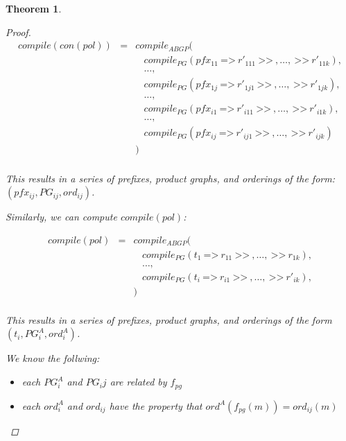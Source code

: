 \documentclass[twocolumn]{sig-alternate-10pt}
\newcommand{\Prefer}{\texttt{>>}}
\newcommand{\Path}{\texttt{=>}}
\newtheorem{thm}{Theorem}[section]
\begin{document}
\begin{thm}
\begin{proof}
    \[ \begin{array}{lcl}
        compile(con(pol)) &=& compile_{ABGP}( \\
                          & & ~~~~ compile_{PG}(pfx_{11} ~\Path~ r'_{111} ~\Prefer~,\dots, ~\Prefer~ r'_{11k} ), \\
                          & & ~~~~ \dots, \\
                          & & ~~~~ compile_{PG}(pfx_{1j} ~\Path~ r'_{1j1} ~\Prefer~,\dots, ~\Prefer~ r'_{1jk} ), \\
                          & & ~~~~ \dots, \\
                          & & ~~~~ compile_{PG}(pfx_{i1} ~\Path~ r'_{i11} ~\Prefer~,\dots, ~\Prefer~ r'_{i1k} ), \\
                          & & ~~~~ \dots, \\
                          & & ~~~~ compile_{PG}(pfx_{ij} ~\Path~ r'_{ij1} ~\Prefer~,\dots, ~\Prefer~ r'_{ijk} ) \\
                          & & ) \\
    \end{array} \]
 
    This results in a series of prefixes, product graphs, and orderings of the form: $(pfx_{ij}, PG_{ij}, ord_{ij})$.

    \vspace{1em}
    Similarly, we can compute $compile(pol)$:

    \[ \begin{array}{lcl}
        compile(pol) &=& compile_{ABGP}( \\
                     & & ~~~~ compile_{PG}(t_1 ~\Path~ r_{11} ~\Prefer~,\dots, ~\Prefer~ r_{1k} ), \\
                     & & ~~~~ \dots, \\
                     & & ~~~~ compile_{PG}(t_i ~\Path~ r_{i1} ~\Prefer~,\dots, ~\Prefer~ r'_{ik} ), \\
                     & & ) \\
    \end{array} \]

    This results in a series of prefixes, product graphs, and orderings of the form $(t_i, PG^A_i, ord^A_i)$.

    We know the follwing:

    \begin{itemize}
      \item each $PG^A_i$ and $PG_ij$ are related by $f_{pg}$
      \item each $ord^A_i$ and $ord_{ij}$ have the property that $ord^A(f_{pg}(m)) = ord_{ij}(m)$
    \end{itemize}
    



\end{proof}
\end{thm}
\end{document}
